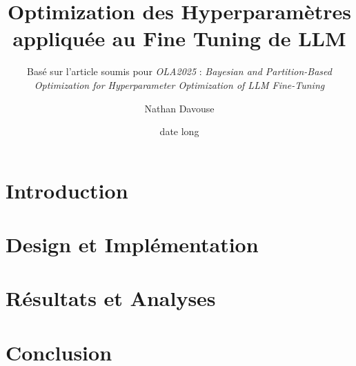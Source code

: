 \documentclass[A4,svgnames,9pt,aspectratio=169]{beamer}
\title[titrecourt]{Optimization des Hyperparamètres appliquée au Fine Tuning de LLM}
\subtitle{Basé sur l'article soumis pour \textit{OLA2025} : \textit{Bayesian and Partition-Based Optimization for Hyperparameter Optimization of LLM Fine-Tuning}}
\date[19/02/2025]{date long}
\author[A. et al.]{Nathan Davouse}
\newcommand*{\disableanim}[1]{{%
  \RenewDocumentCommand{\onslide}{ R<>{} }{}%
  #1%
}}
\begin{document}
\frame{\titlepage}

\renewcommand{\thempfootnote}{\arabic{mpfootnote}}
\renewcommand{\contentsname}{Sommaire}

\section{Introduction}


\section{Design et Implémentation}


\section{Résultats et Analyses}



\section{Conclusion}




\frame{\merci}

\appendix


\end{document}
